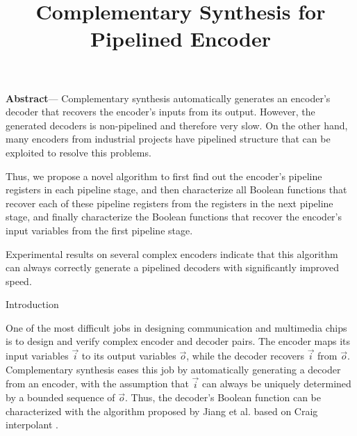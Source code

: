 \documentclass[twocolumn]{article}
\makeatletter
\def\section{\@startsection {section}{1}{\z@}{20pt plus 2pt minus 2pt}
{8pt plus 2pt minus 2pt}{\centering\normalsize\sc
\edef\@svsec{\thesection.\ }}}
\def\thesection{\Roman{section}}
\makeatother
\begin{document}
\date{}

\title{\Large\textbf{Complementary Synthesis for Pipelined Encoder}
}	%


\author{
}
\maketitle
\thispagestyle{empty}

{\small
\textbf{
Abstract}---
Complementary synthesis automatically generates an encoder's decoder
that recovers the encoder's inputs from its output.
However,
the generated decoders is non-pipelined 
and therefore very slow.
On the other hand,
many encoders from industrial projects have pipelined structure 
that can be exploited to resolve this problems.

Thus,
we propose a novel algorithm to first find out the encoder's pipeline registers in each pipeline stage,
and then characterize all Boolean functions that recover each of these pipeline registers
from the registers in the next pipeline stage,
and finally characterize the Boolean functions that recover the encoder's input variables 
from the first pipeline stage.

Experimental results on several complex encoders indicate that
this algorithm can always correctly generate a pipelined decoders with significantly
improved speed.
}

\section{Introduction}

One of the most difficult jobs in designing communication
and multimedia chips is to design and verify complex encoder and decoder pairs.
The encoder maps its input variables $\vec{i}$ to its output variables $\vec{o}$,
while the decoder recovers $\vec{i}$ from $\vec{o}$.
Complementary synthesis 
\cite{ShenICCAD09,ShenTCAD11,ShenTCAD12,LiuICCAD11,LiuTCAD12,TuDAC13}
eases this job by
automatically generating a decoder from an encoder,
with the assumption that $\vec{i}$ can always be
uniquely determined by a bounded sequence of $\vec{o}$.
Thus,
the decoder's Boolean function can be characterized
with the algorithm proposed by Jiang et al. \cite{InterpBoolFunction}
based on Craig interpolant \cite{Craig}.
\end{document}
